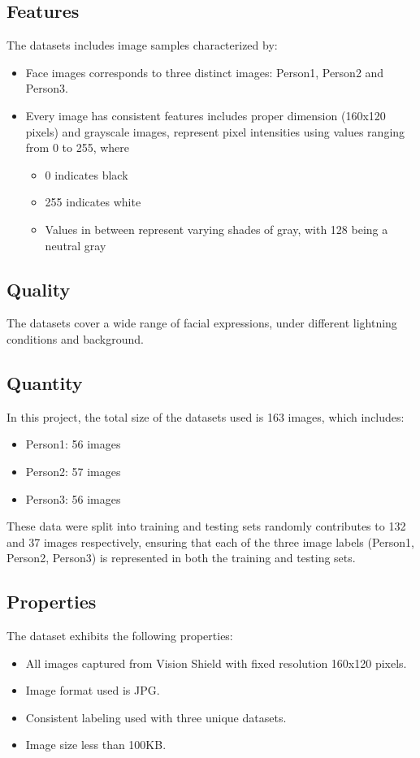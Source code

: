 \subsection{Features}
The datasets includes image samples characterized by:
\begin{itemize}
	\item Face images corresponds to three distinct images: Person1, Person2 and Person3.
	\item Every image has consistent features includes proper dimension (160x120 pixels) and grayscale images, represent pixel intensities using values ranging from 0 to 255, where
	\begin{itemize}
		\item 0 indicates black
		\item 255 indicates white
		\item Values in between represent varying shades of gray, with 128 being a neutral gray
	\end{itemize}
\end{itemize}


\subsection{Quality}

The datasets cover a wide range of facial expressions, under different lightning conditions and background.

\subsection{Quantity}
In this project, the total size of the datasets used is 163 images, which includes:
\begin{itemize}
	\item Person1: 56 images
	\item Person2: 57 images
	\item Person3: 56 images
\end{itemize}

These data were split into training and testing sets randomly contributes to 132 and 37 images respectively, ensuring that each of the three image labels (Person1, Person2, Person3) is represented in both the training and testing sets.

\subsection{Properties}
The dataset exhibits the following properties:
\begin{itemize}
	\item All images captured from Vision Shield with fixed resolution 160x120 pixels.
	\item Image format used is JPG.
	\item Consistent labeling used with three unique datasets.
	\item Image size less than 100KB.
\end{itemize}

